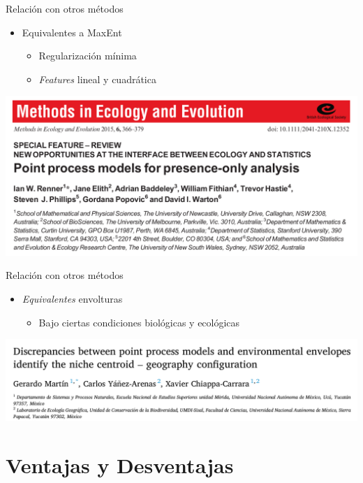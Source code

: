 \documentclass[
  11pt,
  ignorenonframetext,
]{beamer}
\providecommand{\tightlist}{%
  \setlength{\itemsep}{0pt}\setlength{\parskip}{0pt}}
\begin{document}
\begin{frame}{Relación con otros métodos}
\protect\hypertarget{relaciuxf3n-con-otros-muxe9todos}{}
\begin{itemize}
\item
  Equivalentes a MaxEnt

  \begin{itemize}
  \tightlist
  \item
    Regularización mínima
  \item
    \emph{Features} lineal y cuadrática
  \end{itemize}
\end{itemize}

\includegraphics{Figuras/Renner.png}
\end{frame}

\begin{frame}{Relación con otros métodos}
\protect\hypertarget{relaciuxf3n-con-otros-muxe9todos-1}{}
\begin{itemize}
\item
  \emph{Equivalentes} envolturas

  \begin{itemize}
  \tightlist
  \item
    Bajo ciertas condiciones biológicas y ecológicas
  \end{itemize}
\end{itemize}

\includegraphics{Figuras/Discrep.png}
\end{frame}

\hypertarget{ventajas-y-desventajas}{%
\section{Ventajas y Desventajas}\label{ventajas-y-desventajas}}
\end{document}
